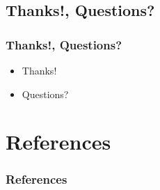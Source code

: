 \documentclass[mathserif,xcolor=dvipsnames,handout]{beamer}
\begin{document}
    \subsection{Thanks!, Questions?}
    \begin{frame}[t]
        \frametitle{Thanks!, Questions?}
        \begin{itemize}
            \item<2-> Thanks!
            \item<3-> Questions?
        \end{itemize}
    \end{frame}

\section*{References}
\begin{frame}[t]
    \frametitle{References}
\end{frame}

\end{document}
